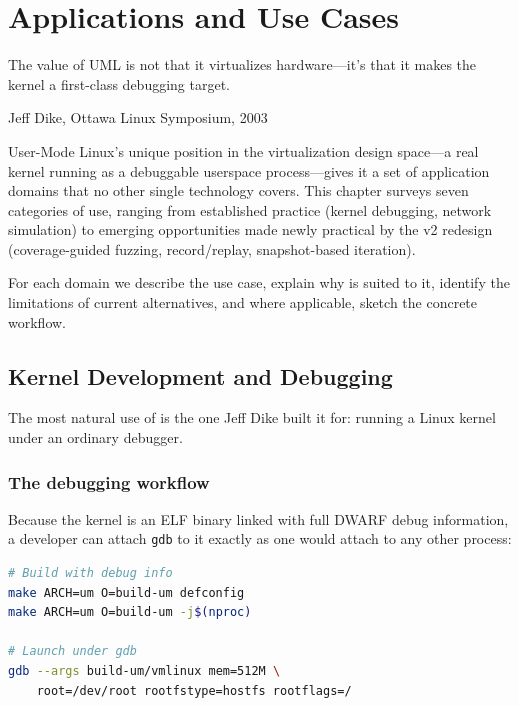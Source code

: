 \chapter{Applications and Use Cases}
\label{ch:applications}

\epigraph{%
  The value of UML is not that it virtualizes hardware---it's that it
  makes the kernel a first-class debugging target.%
}{Jeff Dike, Ottawa Linux Symposium, 2003}

User-Mode Linux's unique position in the virtualization design space---a
real kernel running as a debuggable userspace process---gives it a set
of application domains that no other single technology covers.  This
chapter surveys seven categories of use, ranging from established
practice (kernel debugging, network simulation) to emerging
opportunities made newly practical by the v2 redesign (coverage-guided
fuzzing, record/replay, snapshot-based iteration).

For each domain we describe the use case, explain why \UML{} is suited
to it, identify the limitations of current alternatives, and where
applicable, sketch the concrete workflow.


\section{Kernel Development and Debugging}
\label{sec:app-debugging}

The most natural use of \UML{} is the one Jeff Dike built it for:
running a Linux kernel under an ordinary debugger.

\subsection{The debugging workflow}

Because the \UML{} kernel is an ELF binary linked with full DWARF
debug information, a developer can attach \texttt{gdb} to it exactly
as one would attach to any other process:

\begin{lstlisting}[language=bash,caption={Launching UML under gdb}]
# Build with debug info
make ARCH=um O=build-um defconfig
make ARCH=um O=build-um -j$(nproc)

# Launch under gdb
gdb --args build-um/vmlinux mem=512M \
    root=/dev/root rootfstype=hostfs rootflags=/
\end{lstlisting}

